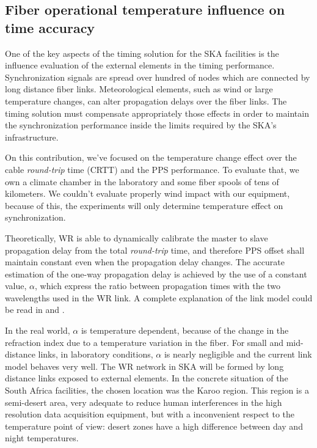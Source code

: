 \subsection{Fiber operational temperature influence on time accuracy}
\label{subsec:temp}

One of the key aspects of the timing solution for the SKA facilities is the 
influence evaluation of the external elements in the timing performance. 
Synchronization signals are spread over hundred of nodes which are connected by 
long distance fiber links. Meteorological elements, such as wind or large 
temperature changes, can alter propagation delays over the fiber 
links. The timing solution must compensate appropriately those effects in order 
to maintain the synchronization performance inside the limits required by the 
SKA's infrastructure.

On this contribution, we've focused on the temperature change effect over the 
cable
\textit{round-trip} time (CRTT) and the PPS performance. To evaluate that, we 
own a climate chamber in the laboratory and some fiber spools of tens of 
kilometers. 
We couldn't evaluate properly wind impact with our equipment, because of this, 
the experiments will only determine temperature effect on synchronization.

Theoretically, WR is able to dynamically calibrate the master to slave 
propagation delay from the total \textit{round-trip} time, and therefore PPS 
offset shall maintain constant even when the propagation delay changes. The 
accurate estimation of the one-way propagation delay is achieved by the use of 
a constant value, $\alpha$, which express the ratio between propagation times 
with the two wavelengths used in the WR link. A complete explanation of the 
link model could be read in \cite{Wlostowski2011} and \cite{Daniluk2012}.

In the real world, $\alpha$ is temperature dependent, because of the change in 
the refraction index due to a temperature variation in the fiber. For small and 
mid-distance links, in laboratory conditions, $\alpha$ is nearly negligible and 
the current link model behaves very well. The WR network in SKA will be formed 
by long distance links exposed to external elements. In the concrete situation 
of the South Africa facilities, the chosen location was the Karoo region. 
This region is a semi-desert area, very adequate to reduce human interferences 
in the high resolution data acquisition equipment, but with a inconvenient 
respect to the temperature point of view: desert zones have a high difference 
between day and night temperatures.

